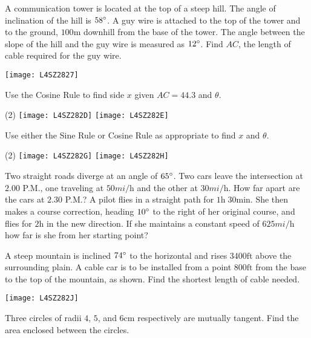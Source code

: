 \begin{Exercise}[title={Applications},label=exApplications]
\begin{multicols}{2}
	\Question A communication tower is located at the top of a steep hill. The angle of inclination
	of the hill is $58 \mbox{{\ensuremath{{}^\circ}}}$. A guy wire is attached to the top of the tower and to the ground, $100 \mbox{m}$ downhill from the base of the tower. The angle between the slope of the hill and the guy wire is measured as $12 \mbox{{\ensuremath{{}^\circ}}}$. Find $A C$, the length of cable required for the guy wire. %
	\columnbreak 
	
	\texttt{[image: L4SZ2827]}	\\
\end{multicols}	
\Question Use the Cosine Rule to find side $x$ given $AC=44.3$ and $\theta$. 
\begin{tasks}(2)
	\task 	\texttt{[image: L4SZ282D]}%
	\task 	\texttt{[image: L4SZ282E]}%
\end{tasks}
\Question Use either the Sine Rule or Cosine Rule as appropriate to find $x$ and $\theta$.
	\begin{tasks}(2)
		\task 	\texttt{[image: L4SZ282G]}%
		\task 	\texttt{[image: L4SZ282H]}%
	\end{tasks}
\Question Two straight roads diverge at an angle of $65 \mbox{{\ensuremath{{}^\circ}}}$. Two cars leave the intersection at $2.00$ P.M., one traveling at $50 mi/\mbox{h}$ and the other at $30 mi/\mbox{h}$. How far apart are the cars at $2.30$ P.M.?%
\Question A pilot flies in a straight path for $1 \mbox{h}\; 30 \mbox{min}$. She then makes a course correction, heading $10 \mbox{{\ensuremath{{}^\circ}}}$ to the right of her original course, and flies for $2 \mbox{h}$ in the new direction. If she maintains a constant speed of $625 mi/\mbox{h}$ how far is she from her starting point?%

\begin{multicols}{2}
	\Question A steep mountain is inclined $74 \mbox{{\ensuremath{{}^\circ}}}$ to the horizontal and rises $3400 \mbox{ft}$ above the surrounding plain. A cable car is to be installed from a point $800 \mbox{ft}$ from the base to the top of the mountain, as shown. Find the shortest length of cable needed.%
	\columnbreak 
	
	\texttt{[image: L4SZ282J]}	\\
\end{multicols}	

\begin{multicols}{2}
	\Question Three circles of radii $4$, $5$, and $6 \mbox{cm}$ respectively are mutually tangent. Find the area enclosed between the circles.%
	\columnbreak 
	

\end{multicols}
\end{Exercise}
